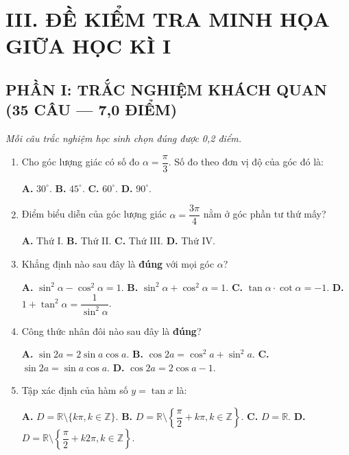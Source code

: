 \documentclass[12pt, a4paper]{article}
\begin{document}
\newpage

\section*{III. ĐỀ KIỂM TRA MINH HỌA GIỮA HỌC KÌ I}

\subsection*{PHẦN I: TRẮC NGHIỆM KHÁCH QUAN (35 CÂU --- 7,0 ĐIỂM)}
\textit{Mỗi câu trắc nghiệm học sinh chọn đúng được 0,2 điểm.}

\begin{enumerate}[leftmargin=1.5em]
    \item Cho góc lượng giác có số đo $\alpha = \dfrac{\pi}{3}$. Số đo theo đơn vị độ của góc đó là:
    \begin{center}
    \textbf{A.} $30^\circ$. \qquad \textbf{B.} $45^\circ$. \qquad \textbf{C.} $60^\circ$. \qquad \textbf{D.} $90^\circ$.
    \end{center}

    \item Điểm biểu diễn của góc lượng giác $\alpha = \dfrac{3\pi}{4}$ nằm ở góc phần tư thứ mấy?
    \begin{center}
    \textbf{A.} Thứ I. \qquad \textbf{B.} Thứ II. \qquad \textbf{C.} Thứ III. \qquad \textbf{D.} Thứ IV.
    \end{center}

    \item Khẳng định nào sau đây là \textbf{đúng} với mọi góc $\alpha$?
    \begin{center}
    \textbf{A.} $\sin^2\alpha - \cos^2\alpha = 1$. \qquad \textbf{B.} $\sin^2\alpha + \cos^2\alpha = 1$. \qquad \textbf{C.} $\tan\alpha \cdot \cot\alpha = -1$. \qquad \textbf{D.} $1 + \tan^2\alpha = \dfrac{1}{\sin^2\alpha}$.
    \end{center}

    \item Công thức nhân đôi nào sau đây là \textbf{đúng}?
    \begin{center}
    \textbf{A.} $\sin 2a = 2\sin a \cos a$. \qquad \textbf{B.} $\cos 2a = \cos^2 a + \sin^2 a$. \qquad \textbf{C.} $\sin 2a = \sin a \cos a$. \qquad \textbf{D.} $\cos 2a = 2\cos a - 1$.
    \end{center}

    \item Tập xác định của hàm số $y = \tan x$ là:
    \begin{center}
    \textbf{A.} $D = \mathbb{R} \setminus \{k\pi, k \in \mathbb{Z}\}$. \qquad \textbf{B.} $D = \mathbb{R} \setminus \left\{\dfrac{\pi}{2} + k\pi, k \in \mathbb{Z}\right\}$. \qquad \textbf{C.} $D = \mathbb{R}$. \qquad \textbf{D.} $D = \mathbb{R} \setminus \left\{\dfrac{\pi}{2} + k2\pi, k \in \mathbb{Z}\right\}$.
    \end{center}


\end{enumerate}
\end{document}
